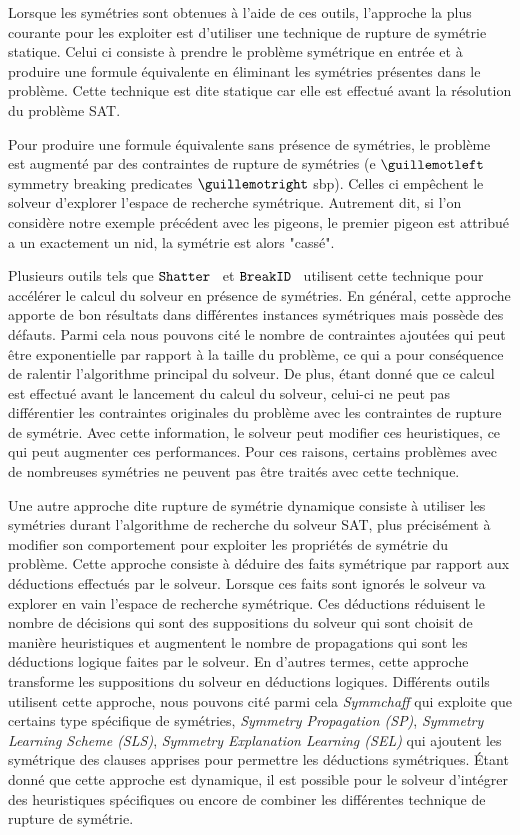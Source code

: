 Lorsque les symétries sont obtenues à l'aide de ces outils, l'approche la plus courante pour les exploiter est d'utiliser une technique de rupture de symétrie statique. Celui ci consiste à prendre le problème symétrique en entrée et à produire une formule équivalente en éliminant les symétries présentes dans le problème.
Cette technique est dite statique car elle est effectué avant la résolution du problème SAT. 

Pour produire une formule équivalente sans présence de symétries, le problème est augmenté par des 
contraintes de rupture de  symétries (e $\guillemotleft$symmetry breaking predicates $\guillemotright$ sbp). Celles ci empêchent le solveur d'explorer l'espace de recherche symétrique. 
Autrement dit, si l'on considère notre exemple précédent avec les pigeons, le premier pigeon est attribué a un
exactement un nid, la symétrie est alors "cassé".

Plusieurs outils tels que $\texttt{Shatter}$~\cite{} et $\texttt{BreakID}$~\cite{} utilisent cette technique pour accélérer le calcul du solveur en présence de symétries.
En général, cette approche apporte de bon résultats dans différentes instances symétriques mais possède des défauts. Parmi cela nous pouvons cité le nombre de contraintes ajoutées qui peut être exponentielle par rapport à la taille du problème, ce qui a pour conséquence de ralentir l'algorithme principal du solveur.
De plus, étant donné que ce calcul est effectué avant le lancement du calcul du solveur, celui-ci ne peut pas différentier les contraintes originales du problème avec les contraintes de rupture de symétrie. Avec cette information, le solveur peut modifier ces heuristiques, ce qui peut augmenter ces performances.
Pour ces raisons, certains problèmes avec de nombreuses symétries ne peuvent pas être traités avec cette technique.

Une autre approche dite rupture de symétrie dynamique consiste à utiliser les symétries durant l'algorithme de recherche du solveur SAT, plus précisément à modifier son comportement pour exploiter les propriétés de symétrie du problème. Cette approche consiste à déduire des faits symétrique par rapport aux déductions effectués par le solveur. Lorsque ces faits sont ignorés le solveur va explorer en vain l'espace de recherche symétrique.
Ces déductions réduisent le nombre de décisions qui sont des suppositions du solveur qui sont choisit de 
manière heuristiques et augmentent le nombre de propagations qui sont les déductions logique faites par le solveur. En d'autres termes, cette approche transforme les suppositions du solveur en déductions logiques.
Différents outils utilisent cette approche, nous pouvons cité parmi cela \textit{Symmchaff}
qui exploite que certains type spécifique de symétries, \textit{Symmetry Propagation (SP)}, \textit{Symmetry Learning Scheme (SLS)}, \textit{Symmetry Explanation Learning (SEL)} qui ajoutent les symétrique des
clauses apprises pour permettre les déductions symétriques.
Étant donné que cette approche est dynamique, il est possible pour le solveur 
d'intégrer des heuristiques spécifiques ou encore de combiner les différentes technique de rupture de symétrie.


